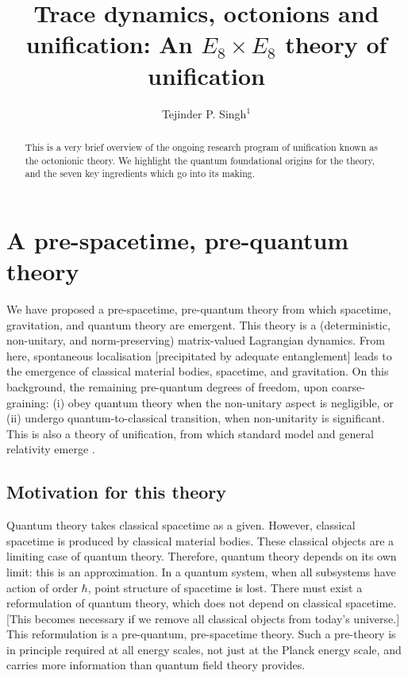 \documentclass{iopconfser}
\begin{document}
\title{Trace dynamics, octonions and unification: An $E_8 \times E_8$ theory of unification}

\author{Tejinder P. Singh$^{1}$}




\begin{abstract}
This is a very brief overview of the ongoing research program of unification known as the octonionic theory. We highlight the quantum foundational origins for the theory, and the seven key ingredients which go into its making.
\end{abstract}

\section{A pre-spacetime, pre-quantum theory}
We have proposed a pre-spacetime, pre-quantum theory from which spacetime, gravitation, and quantum theory are emergent.
This theory is a (deterministic, non-unitary, and norm-preserving) matrix-valued Lagrangian dynamics.
From here, spontaneous localisation [precipitated by adequate entanglement] leads to the emergence of classical material bodies, spacetime, and gravitation.
On this background, the remaining pre-quantum degrees of freedom, upon coarse-graining:
    (i) obey quantum theory when the non-unitary aspect is negligible, or
    (ii) undergo quantum-to-classical transition, when non-unitarity is significant.  
This is also a theory of unification, from which standard model and general relativity emerge \cite{Singh1}.
                                                                                                                     



\subsection{Motivation for this theory}
Quantum theory takes classical spacetime as a given.
However, classical spacetime is produced by classical material bodies.
These classical objects are a limiting case of quantum theory.
Therefore, quantum theory depends on its own limit: this is an approximation.
In a quantum system, when all subsystems have action of order $\hbar$, point structure of spacetime is lost.
There must exist a reformulation of quantum theory, which does not depend on classical spacetime.       [This becomes necessary if we remove all classical objects from today’s universe.]
This reformulation is a pre-quantum, pre-spacetime theory.
Such a pre-theory is in principle required at all energy scales, not just at the Planck energy scale, and carries more information than quantum field theory provides.
\end{document}
